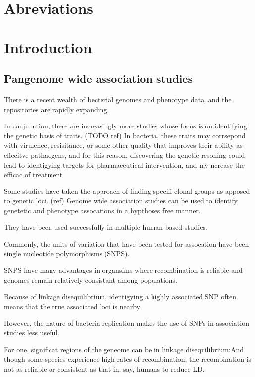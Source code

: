\documentclass[]{DissertateUSU}
\begin{document}
\hypertarget{abreviations}{%
\section{Abreviations}\label{abreviations}}

\hypertarget{introduction}{%
\section{Introduction}\label{introduction}}

\hypertarget{pangenome-wide-association-studies}{%
\subsection{Pangenome wide association
studies}\label{pangenome-wide-association-studies}}

There is a recent wealth of becterial genomes and phenotype data, and
the repositories are rapidly expanding.

In conjunction, there are increasingly more studies whose focus is on
identifying the genetic basis of traits. (TODO ref) In bacteria, these
traits may corrsepond with virulence, resisitance, or some other quality
that improves their ability as effecitve pathaogens, and for this
reason, discovering the genetic resoning could lead to identigying
targets for pharmaceutical intervention, and my ncrease the efficac of
treatment

Some studies have taken the approach of finding specifi clonal groups as
apposed to genetic loci. (ref) Genome wide association studies can be
used to identify genetetic and phenotype assocations in a hypthoses free
manner.

They have been used successfully in multiple human based studies.

Commonly, the units of variation that have been tested for assocation
have been single nucleotide polymorphisms (SNPS).

SNPS have many advantages in organsims where recombination is reliable
and genomes remain relatively consistant among populations.

Because of linkage disequilibrium, identigying a highly associated SNP
often means that the true associated loci is nearby

However, the nature of bacteria replication makes the use of SNPs in
association studies less useful.

For one, significat regions of the geneome can be in linkage
disequilibrium:And though some species experience high rates of
recombination, the recombination is not as reliable or consistent as
that in, say, humans to reduce LD.
\end{document}

